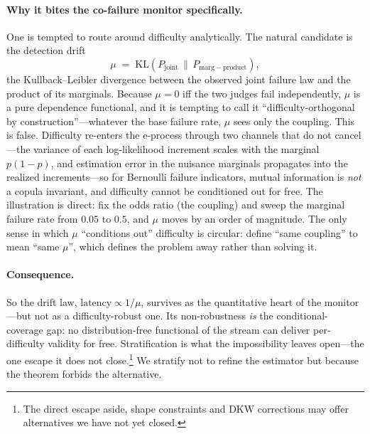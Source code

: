 \documentclass[11pt,a4paper]{article}
\begin{document}
\paragraph{Why it bites the co-failure monitor specifically.}
One is tempted to route around difficulty analytically.  The natural candidate is the detection
drift
\[
  \mu \;=\; \mathrm{KL}(P_{\mathrm{joint}} \,\|\, P_{\mathrm{marg-product}}),
\]
the Kullback--Leibler divergence between the observed joint failure law and the product of its
marginals.  Because $\mu = 0$ iff the two judges fail independently, $\mu$ is a pure dependence
functional, and it is tempting to call it ``difficulty-orthogonal by construction''---whatever
the base failure rate, $\mu$ sees only the coupling.  This is false.  Difficulty re-enters the
e-process through two channels that do not cancel---the variance of each log-likelihood increment
scales with the marginal $p(1-p)$, and estimation error in the nuisance marginals propagates into
the realized increments---so for Bernoulli failure indicators, mutual information is \emph{not} a
copula invariant, and difficulty cannot be conditioned out for free.  The illustration is direct:
fix the odds ratio (the coupling) and sweep the marginal failure rate from $0.05$ to $0.5$,
and $\mu$ moves by an order of magnitude.  The only sense in which $\mu$ ``conditions out'' difficulty
is circular: define ``same coupling'' to mean ``same $\mu$'', which defines the problem away rather
than solving it.

\paragraph{Consequence.}
So the drift law, $\text{latency} \propto 1/\mu$, survives as the quantitative heart of the
monitor---but not as a difficulty-robust one.  Its non-robustness \emph{is} the
conditional-coverage gap: no distribution-free functional of the stream can deliver per-difficulty
validity for free.  Stratification is what the impossibility leaves open---the one escape it
does not close.\footnote{The direct escape aside, shape constraints and DKW corrections may offer
alternatives we have not yet closed.}  We stratify not to refine the estimator but because the theorem forbids the
alternative.
\end{document}
